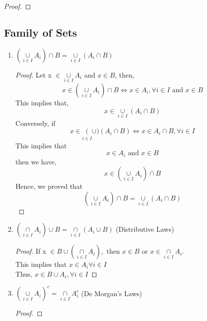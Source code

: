 \documentclass[letterpaper, 12pt]{article}
\newcommand{\1}{\mathds{1}}	%
\theoremstyle{definition}
\begin{document}
{\begin{enumerate}
\begin{proof}
    \end{proof}
\end{enumerate}



\subsection{Family of Sets}


\begin{enumerate}
    \item $(\underset{i \in I} \cup A_i) \cap B = \underset{i \in I} \cup (A_i \cap B)$
    \begin{proof}
        Let x $\in \underset{i \in I} \cup A_i$ and $x \in B$, then, \\
        \[x \in (\underset{i \in I} \cup A_i) \cap B \Longleftrightarrow x \in A_i, \forall i \in I \text{ and } x \in B\]
        This implies that, \[x \in \underset{i \in I} \cup (A_i \cap B)\]
        Conversely, if \[x \in \underset{i \in I} (\cup) (A_i \cap B) \Longleftrightarrow x \in A_i \cap B, \forall i \in I\]
        This implies that \[x \in A_i \text{ and } x \in B\]
        then we have, \[x \in (\underset{i \in I} \cup A_i) \cap B\]
        Hence, we proved that \[(\underset{i \in I} \cup A_i) \cap B = \underset{i \in I} \cup (A_i \cap B)\]
    \end{proof}
    \item $(\underset{i \in I} \cap A_i) \cup B = \underset{i \in I} \cap (A_i \cup B)$ (Distributive Laws)
    \begin{proof}
        If x $\in B \cup (\underset{i \in I} \cap A_i),$ then $x \in B \text{ or } x \in \underset{i \in I} \cap A_i$. \\
        This implies that $x \in A_i \forall i \in I$ \\
        Thus, $x \in B \cup A_i, \forall i \in I$
    \end{proof}
    \item $(\underset{i \in I} \cup A_i)^c = \underset{i \in I} \cap A_i^c$ (De Morgan's Laws)
    \begin{proof}
        

\end{proof}
\end{enumerate}}
\end{document}
